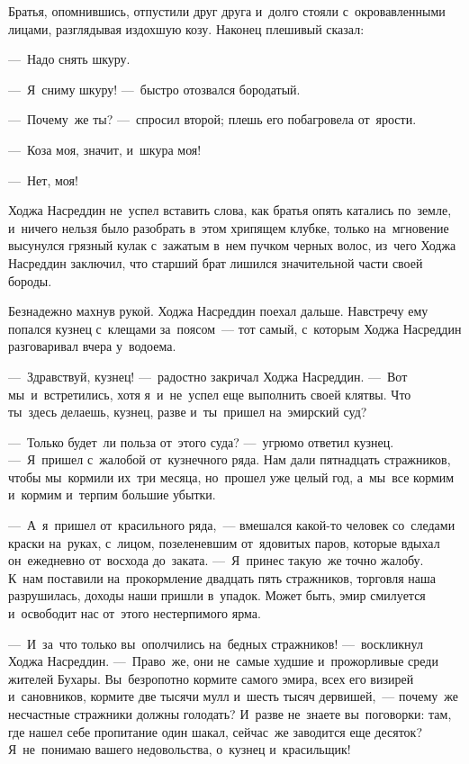 \documentclass[12pt,a4paper]{book}
\begin{document}
Братья, опомнившись, отпустили друг друга и~долго стояли с~окровавленными лицами, разглядывая издохшую козу. Наконец плешивый сказал:

—~Надо снять шкуру.

—~Я~сниму шкуру! —~быстро отозвался бородатый.

—~Почему~же ты? —~спросил второй; плешь его побагровела от~ярости.

—~Коза моя, значит, и~шкура моя!

—~Нет, моя!

Ходжа Насреддин не~успел вставить слова, как братья опять катались по~земле, и~ничего нельзя было разобрать в~этом хрипящем клубке, только на~мгновение высунулся грязный кулак с~зажатым в~нем пучком черных волос, из~чего Ходжа Насреддин заключил, что старший брат лишился значительной части своей бороды.

Безнадежно махнув рукой. Ходжа Насреддин поехал дальше. Навстречу ему попался кузнец с~клещами за~поясом~— тот самый, с~которым Ходжа Насреддин разговаривал вчера у~водоема.

—~Здравствуй, кузнец! —~радостно закричал Ходжа Насреддин. —~Вот мы~и~встретились, хотя я~и~не~успел еще выполнить своей клятвы. Что ты~здесь делаешь, кузнец, разве и~ты~пришел на~эмирский суд?

—~Только будет~ли польза от~этого суда? —~угрюмо ответил кузнец. —~Я~пришел с~жалобой от~кузнечного ряда. Нам дали пятнадцать стражников, чтобы мы~кормили их~три месяца, но~прошел уже целый год, а~мы~все кормим и~кормим и~терпим большие убытки.

—~А~я~пришел от~красильного ряда,~— вмешался какой-то человек со~следами краски на~руках, с~лицом, позеленевшим от~ядовитых паров, которые вдыхал он~ежедневно от~восхода до~заката. —~Я~принес такую~же точно жалобу. К~нам поставили на~прокормление двадцать пять стражников, торговля наша разрушилась, доходы наши пришли в~упадок. Может быть, эмир смилуется и~освободит нас от~этого нестерпимого ярма.

—~И~за~что только вы~ополчились на~бедных стражников! —~воскликнул Ходжа Насреддин. —~Право~же, они не~самые худшие и~прожорливые среди жителей Бухары. Вы~безропотно кормите самого эмира, всех его визирей и~сановников, кормите две тысячи мулл и~шесть тысяч дервишей,~— почему~же несчастные стражники должны голодать? И~разве не~знаете вы~поговорки: там, где нашел себе пропитание один шакал, сейчас~же заводится еще десяток? Я~не~понимаю вашего недовольства, о~кузнец и~красильщик!
\end{document}
